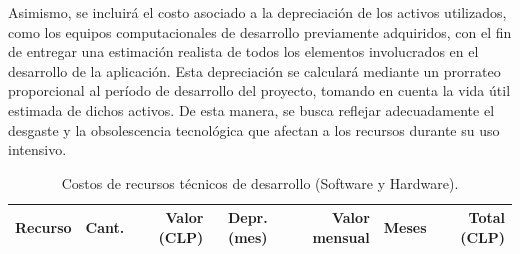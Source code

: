 Asimismo, se incluirá el costo asociado a la depreciación de los activos utilizados, como los equipos computacionales de desarrollo previamente adquiridos, con el fin de entregar una estimación realista de todos los elementos involucrados en el desarrollo de la aplicación. Esta depreciación se calculará mediante un prorrateo proporcional al período de desarrollo del proyecto, tomando en cuenta la vida útil estimada de dichos activos. De esta manera, se busca reflejar adecuadamente el desgaste y la obsolescencia tecnológica que afectan a los recursos durante su uso intensivo.
\newpage
{\small\setlength{\tabcolsep}{4pt}
\begin{table}[H]
    
    \centering
    
    \caption{Costos de recursos técnicos de desarrollo (Software y Hardware).}
    \label{tab:costos_recursos_tecnicos}
    
    {\small\setlength{\tabcolsep}{4pt}
    
    \begin{tabular}{|p{}|c|r|c|r|c|r|}
    
    \hline
    \textbf{Recurso} & \textbf{Cant.} & \textbf{Valor (CLP)} & \textbf{Depr. (mes)} & \textbf{Valor mensual} & \textbf{Meses} & \textbf{Total (CLP)}\\
    \hline
    

\end{tabular}}
\end{table}}
